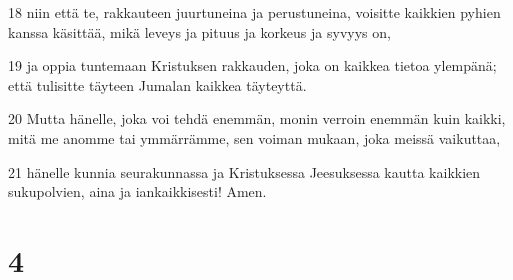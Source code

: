 \par 18 niin että te, rakkauteen juurtuneina ja perustuneina, voisitte kaikkien pyhien kanssa käsittää, mikä leveys ja pituus ja korkeus ja syvyys on,
\par 19 ja oppia tuntemaan Kristuksen rakkauden, joka on kaikkea tietoa ylempänä; että tulisitte täyteen Jumalan kaikkea täyteyttä.
\par 20 Mutta hänelle, joka voi tehdä enemmän, monin verroin enemmän kuin kaikki, mitä me anomme tai ymmärrämme, sen voiman mukaan, joka meissä vaikuttaa,
\par 21 hänelle kunnia seurakunnassa ja Kristuksessa Jeesuksessa kautta kaikkien sukupolvien, aina ja iankaikkisesti! Amen.

\chapter{4}

